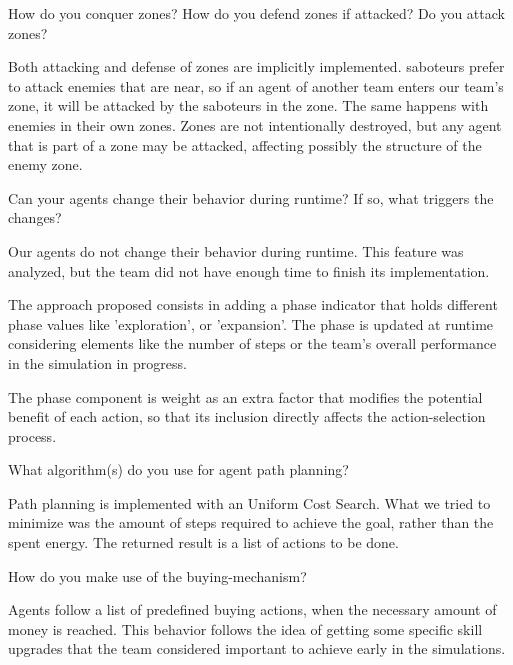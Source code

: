 \begin{question}
How do you conquer zones? How do you defend zones if attacked? Do you attack
zones?  
\end{question}

Both attacking and defense of zones are implicitly implemented.  saboteurs
prefer to attack enemies that are near, so if an agent of another team enters
our team's zone, it will be attacked by the saboteurs in the zone.  The same
happens with enemies in their own zones. Zones are not intentionally destroyed,
but any agent that is part of a zone may be attacked, affecting possibly the
structure of the enemy zone.

\begin{question}
Can your agents change their behavior during runtime? If so, what triggers
the changes?  
\end{question}
Our agents do not change their behavior during runtime. This feature was 
    analyzed, but the team did not have enough time to finish its implementation.
    
    The approach proposed consists in adding a phase indicator that holds different 
    phase values like 'exploration', or 'expansion'. The phase is updated at runtime
    considering elements like the number of steps or the team's overall performance 
    in the simulation in progress.
    
    The phase component is weight as an extra factor that modifies the potential 
    benefit of each action, so that its inclusion directly affects the action-selection 
    process.
    
\begin{question}
What algorithm(s) do you use for agent path planning?  
\end{question}

Path planning is implemented with an Uniform Cost Search. What we tried to
minimize was the amount of steps required to achieve the goal, rather than the
spent energy. The returned result is a list of actions to be done.

\begin{question}
How do you make use of the buying-mechanism?  
\end{question}

Agents follow a list of predefined buying actions, when the necessary amount of
money is reached. This behavior follows the idea of getting some specific skill
upgrades that the team considered important to achieve early in the simulations.

